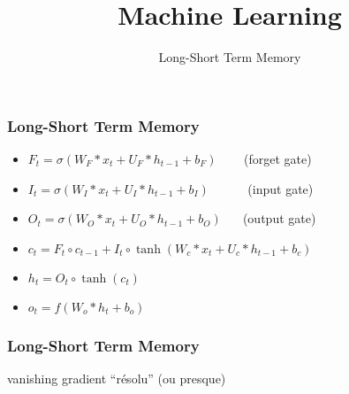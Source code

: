 \documentclass{formation}
\title{Machine Learning}
\subtitle{Long-Short Term Memory}
\begin{document}
\maketitle

\begin{frame}
  \frametitle{Long-Short Term Memory}
  \begin{itemize}
  \item $F_{t}=\sigma (W_{F}*x_{t}+U_{F}*h_{t-1}+b_{F})\;\;\;\;\;\;\,$ (forget gate)
  \item $I_{t} =\sigma (W_{I}*x_{t}+U_{I}*h_{t-1}+b_{I})\;\;\;\;\;\;\;\;\;\;$ (input gate)
  \item $O_{t} =\sigma (W_{O}*x_{t}+U_{O}*h_{t-1}+b_{O})\;\;\;\;\;$ (output gate)
  \item $c_{t} =F_{t}\circ c_{t-1}+I_{t}\circ \tanh(W_{c}*x_{t}+U_{c}*h_{t-1}+b_{c})$
  \item $h_{t} =O_{t}\circ \tanh(c_{t})$
  \item $o_{t} =f(W_{o}*h_{t}+b_{o})$
  \end{itemize}
\end{frame}

\begin{frame}
  \frametitle{Long-Short Term Memory}
  vanishing gradient ``résolu'' (ou presque)
\end{frame}
\end{document}
